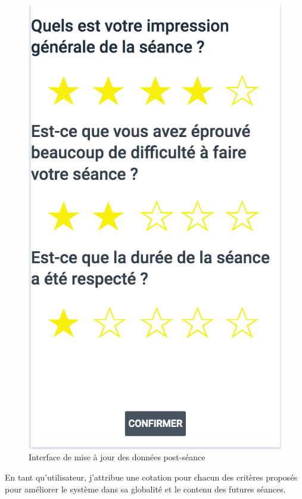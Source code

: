 \begin{figure}[!h]
\centering
\includegraphics[scale=0.3]{ihms/rating_before_update}
\caption{Interface de mise à jour des données post-séance}
\end{figure} 

\begin{itshape}
En tant qu'utilisateur, j'attribue une cotation pour chacun des critères proposés pour améliorer le système dans sa globalité et le contenu des futures séances.
\end{itshape}

